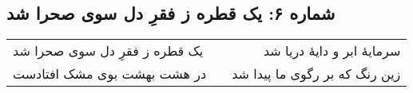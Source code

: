 \begin{center}
\section*{شماره ۶: یک قطره ز فقرِ دل سوی صحرا شد}
\label{sec:006}
\begin{longtable}{l p{0.5cm} r}
یک قطره ز فقرِ دل سوی صحرا شد
&&
سرمایهٔ ابر و دایهٔ دریا شد
\\
در هشت بهشت بوی مشک افتادست
&&
زین رنگ که بر رگوی ما پیدا شد
\\
\end{longtable}
\end{center}
